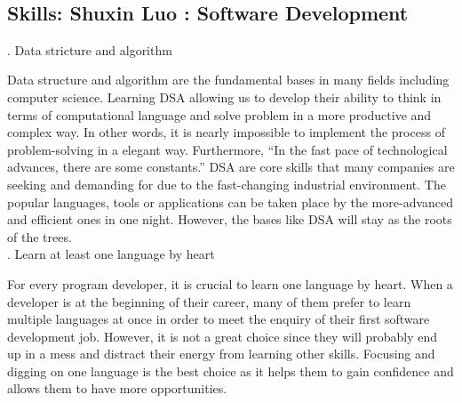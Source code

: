 \documentclass[a4paper, 11pt]{report}
\begin{document}
\\

\subsection{Skills: Shuxin Luo : Software Development}

. Data stricture and algorithm

\noindent Data structure and algorithm are the fundamental bases in many fields including computer science. Learning DSA allowing us to develop their ability to think in terms of computational language and solve problem in a more productive and complex way. In other words, it is nearly impossible to implement the process of problem-solving in a elegant way. Furthermore, “In the fast pace of technological advances, there are some constants.”\cite{DSA} DSA are core skills that many companies are seeking and demanding for due to the fast-changing industrial environment. The popular languages, tools or applications can be taken place by the more-advanced and efficient ones in one night. However, the bases like DSA will stay as the roots of the trees.\\

. Learn at least one language by heart

\noindent For every program developer, it is crucial to learn one language by heart.\cite{combo} When a developer is at the beginning of their career, many of them prefer to learn multiple languages at once in order to meet the enquiry of their first software development job. However, it is not a great choice since they will probably end up in a mess and distract their energy from learning other skills. Focusing and digging on one language is the best choice as it helps them to gain confidence and allows them to have more opportunities.\\
\end{document}
